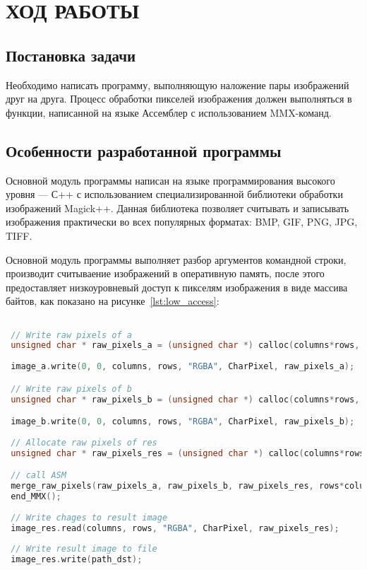 \section{ХОД РАБОТЫ}

\subsection{Постановка задачи}

Необходимо написать программу, выполняющую наложение пары изображений друг на друга.
Процесс обработки пикселей изображения должен выполняться в функции,
написанной на языке Ассемблер с использованием MMX-команд.

\subsection{Особенности разработанной программы}

Основной модуль программы написан на языке программирования высокого уровня --- С++ с
использованием специализированной библиотеки обработки изображений Magick++. 
Данная библиотека позволяет считывать и записывать изображения практически 
во всех популярных форматах: BMP, GIF, PNG, JPG, TIFF.

Основной модуль программы выполняет разбор аргументов командной строки,
производит считываение изображений в оперативную память, после этого
предоставляет низкоуровневый доступ к пикселям изображения в виде 
массива байтов, как показано на рисунке~\ref{lst:low_access}:

\begin{lstlisting}[caption=Предоставление низкоуровневого доступа к изображению,
label=lst:low_access,language={C++},basicstyle=\scriptsize\ttfamily]

 // Write raw pixels of a
 unsigned char * raw_pixels_a = (unsigned char *) calloc(columns*rows, SIZE_RGBA);
   
 image_a.write(0, 0, columns, rows, "RGBA", CharPixel, raw_pixels_a);

 // Write raw pixels of b
 unsigned char * raw_pixels_b = (unsigned char *) calloc(columns*rows, SIZE_RGBA);

 image_b.write(0, 0, columns, rows, "RGBA", CharPixel, raw_pixels_b);
   
 // Allocate raw pixels of res
 unsigned char * raw_pixels_res = (unsigned char *) calloc(columns*rows, SIZE_RGBA);

 // call ASM
 merge_raw_pixels(raw_pixels_a, raw_pixels_b, raw_pixels_res, rows*columns);
 end_MMX();
   
 // Write chages to result image
 image_res.read(columns, rows, "RGBA", CharPixel, raw_pixels_res);
   
 // Write result image to file 
 image_res.write(path_dst);
\end{lstlisting}

